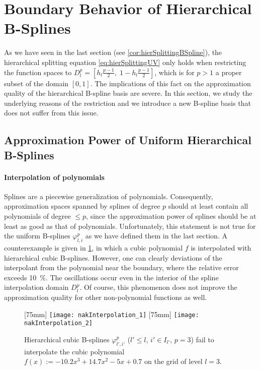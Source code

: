 \section{Boundary Behavior of Hierarchical B-Splines}
\label{sec:32notAKnot}

As we have seen in the last section (see \cref{cor:hierSplittingBSpline}),
the hierarchical splitting equation \eqref{eq:hierSplittingUV}
only holds when restricting the function spaces to
$D_l^p = [h_l \tfrac{p-1}{2},\; 1 - h_l \tfrac{p-1}{2}]$,
which is for $p > 1$ a proper subset of the domain $[0, 1]$.
The implications of this fact on the approximation quality
of the hierarchical B-spline basis are severe.
In this section, we study the underlying reasons of the restriction and
we introduce a new B-spline basis that does not suffer from this issue.



\subsection{Approximation Power of Uniform Hierarchical B-Splines}

\paragraph{Interpolation of polynomials}

Splines are a piecewise generalization of polynomials.
Consequently, approximation spaces spanned by splines of degree $p$ should
at least contain all polynomials of degree $\le p$,
since the approximation power of splines should be at least as good
as that of polynomials.
Unfortunately, this statement is not true for the uniform B-splines
$\varphi_{l,i}^p$ as we have defined them in the last section.
A counterexample is given in \cref{fig:nakInterpolation},
in which a cubic polynomial $f$ is interpolated with
hierarchical cubic B-splines.
However, one can clearly deviations of the interpolant from the polynomial
near the boundary, where the relative error exceeds \SI{10}{\percent}.
The oscillations occur even in the interior of the
spline interpolation domain $D_l^p$.
Of course, this phenomenon does not improve the approximation quality
for other non-polynomial functions as well.

\begin{figure}
  [75mm]{%
    \texttt{[image: nakInterpolation\_1]}%
  }%
  \hfill%
  [75mm]{%
    \texttt{[image: nakInterpolation\_2]}%
  }%
  \caption{%
    Hierarchical cubic B-splines $\varphi_{l',i'}^p$
    ($l' \le l$, $i' \in I_{l'}$, $p = 3$)
    fail to interpolate the cubic polynomial
    $f(x) := -10.2 x^3 + 14.7 x^2 - 5x + 0.7$
    on the grid of level $l = 3$.%
  }
  \label{fig:nakInterpolation}
\end{figure}

